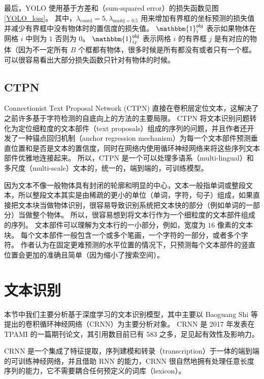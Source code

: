 最后，YOLO 使用基于方差和（sum-squared error）的损失函数见图\ref{YOLO_loss}。
其中，$\lambda_{\text{coord}} = 5, \lambda_{\text{noobj} = 0.5}$ 用来增加有界框的坐标预测的损失值并减少有界框中没有物体时的置信度的损失值。
$\mathbbm{1}_i^{\textsf{obj}}$ 表示如果物体在网格 $i$ 中则为 $1$ 否则为 $0$。
$\mathbbm{1}^{\textsf{obj}}_{ij}$ 表示网格 $i$ 的有界框 $j$ 是有对应的物体（因为不一定所有 $B$ 个框都有物体，很多时候是所有都没有或者只有一个框。
可以很容易看出大部分损失函数只针对有物体的时候。

\subsection{CTPN}
Connectionist Text Proposal Network (CTPN) 直接在卷积层定位文本，这解决了之前许多基于字符检测的自底向上的方法的主要局限。
CTPN 将文本识别问题转化为定位细粒度的文本部件（text proposals）组成的序列的问题，并且作者还开发了一种锚点回归机制（anchor regression mechanism）为每一个文本部件预测垂直位置和是否是文本的置信度，同时在网络内使用循环神经网络来将这些序列文本部件优雅地连接起来。
所以，CTPN 是一个可以处理多语系（multi-lingual）和多尺度（multi-scale）文本的，统一的，端到端的，可训练模型。

因为文本不像一般物体具有封闭的轮廓和明显的中心，文本一般指单词或整段文本，所以整段文本其实是由稀疏的更小的单位（单词，字符，句子）组成，如果直接把文本块当做物体识别，很容易导致识别系统把文本快的部分（例如单词的一部分）当做整个物体。
所以，很容易想到将文本行作为一个细粒度的文本部件组成的序列。
文本部件可以理解为文本行的一小部分，例如，宽度为 $16$ 像素的文本块。
每个文本部件一般包含一个或多个笔画，一个字符的一部分，或者多个字符。
作者认为在固定更难预测的水平位置的情况下，只预测每个文本部件的竖直位置会更加的准确且简单（因为缩小了搜索空间）。

\section{文本识别}
本节中我们主要分析基于深度学习的文本识别模型，其中主要以 Baoguang Shi 等提出的卷积循环神经网络（CRNN）\cite{CRNN}为主要分析对象。
CRNN 是 2017 年发表在 TPAMI 的一篇期刊论文，其引用数目前已有 $583$ 之多，足见起有效性及影响力。

CRNN 是一个集成了特征提取，序列建模和转录（transcription）于一体的端到端的可训练神经网络，并且借助 RNN 的能力，CRNN 很自然地拥有处理任意长度序列的能力，它不需要耦合任何预定义的词库（lexicon）。

